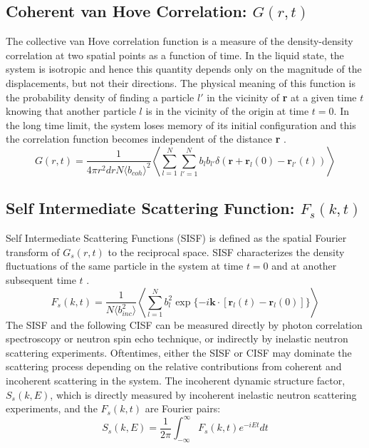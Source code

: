 \documentclass{article}
\begin{document}
\subsection{Coherent van Hove Correlation: $G(r,t)$} \label{sec::Grt}
The collective van Hove correlation function is a measure of the density-density correlation at two spatial points as a function of time. In the liquid state, the system is isotropic and hence this quantity depends only on the magnitude of the displacements, but not their directions. The physical meaning of this function is the probability density of finding a particle $l'$ in the vicinity of \textbf{r} at a given time $t$ knowing that another particle $l$ is in the vicinity of the origin at time $t = 0$. In the long time limit, the system loses memory of its initial configuration and this the correlation function becomes independent of the distance \textbf{r} \cite{EGELSTAFF, Hansen}.
\begin{equation}
	\label{eq:grc}
	G(r,t) = \frac{1}{4\pi r^2drN\langle b_{coh}\rangle^2}\left\langle\sum\limits_{l=1}^N\sum\limits_{l'=1}^N b_lb_{l'}\delta(\mathbf{r}+\mathbf{r}_l(0)-\mathbf{r}_{l'}(t))\right\rangle
\end{equation}

\subsection{Self Intermediate Scattering Function: $F_s(k,t)$} \label{sec::Fsqt}
Self Intermediate Scattering Functions (SISF) is defined as the spatial Fourier transform of $G_s(r,t)$ to the reciprocal space. SISF characterizes the density fluctuations of the same particle in the system at time $t = 0$ and at another subsequent time $t$ \cite{EGELSTAFF, Hansen}.
\begin{equation}
	\label{eq:fsqt}
	F_s(k,t) = \frac{1}{N\langle b_{inc}^2\rangle} \left\langle \sum_{l=1}^{N} b_l^2\exp{\{-i\mathbf{k}\cdot[\mathbf{r}_l(t) - \mathbf{r}_l(0)]}\}\right\rangle
\end{equation}
The SISF and the following CISF can be measured directly by photon correlation spectroscopy or neutron spin echo technique, or indirectly by inelastic neutron scattering experiments. Oftentimes, either the SISF or CISF may dominate the scattering process depending on the relative contributions from coherent and incoherent scattering in the system. The incoherent dynamic structure factor, $S_s(k,E)$, which is directly measured by incoherent inelastic neutron scattering experiments, and the $F_s(k,t)$ are Fourier pairs:
\begin{equation}
	S_s(k,E) = \frac{1}{2\pi} \int_{-\infty}^\infty F_s(k,t) e^{-iEt} dt
\end{equation}
\end{document}
